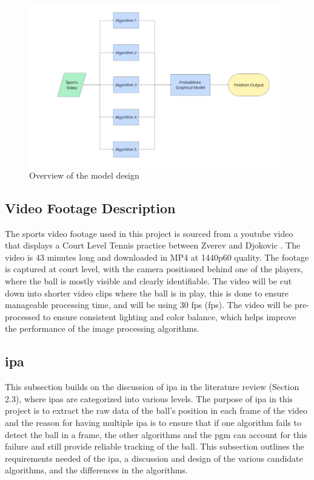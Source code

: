 \documentclass[12pt,a4paper]{article}
\begin{document}
\begin{figure}[H]
	\centering
	\includegraphics[width=1\textwidth]{ProjectOverview.jpg}
	\caption{Overview of the model design}
	\label{fig:model_overview}
\end{figure}

\subsection{Video Footage Description}

The sports video footage used in this project is sourced from a youtube video that displays a Court Level Tennis practice between Zverev and Djokovic \parencite{youtube_ZverevDjokovic}. The video is 43 minutes long and downloaded in MP4 at 1440p60 quality. The footage is captured at court level, with the camera positioned behind one of the players, where the ball is mostly visible and clearly identifiable. The video will be cut down into shorter video clips where the ball is in play, this is done to ensure manageable processing time, and will be using 30 \acl{fps} (\acs{fps}). The video will be pre-processed to ensure consistent lighting and color balance, which helps improve the performance of the image processing algorithms.

\subsection{\acl{ipa}}
This subsection builds on the discussion of \acs{ipa} in the literature review (Section 2.3), where \acs{ipa}s are categorized into various levels. The purpose of \acs{ipa} in this project is to extract the raw data of the ball's position in each frame of the video and the reason for having multiple \acs{ipa} is to ensure that if one algorithm fails to detect the ball in a frame, the other algorithms and the \acs{pgm} can account for this failure and still provide reliable tracking of the ball. This subsection outlines the requirements needed of the \acs{ipa}, a discussion and design of the various candidate algorithms, and the differences in the algorithms. 
\end{document}
